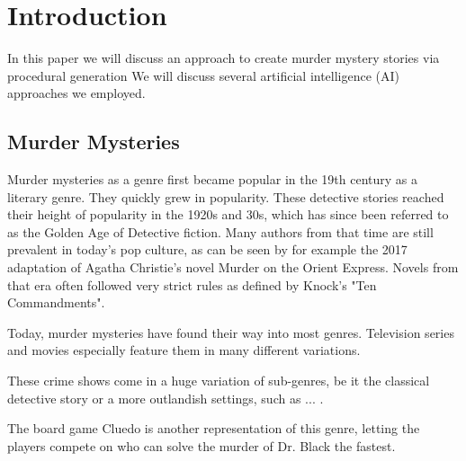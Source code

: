 \section{Introduction} \label{introduction}

In this paper we will discuss an approach to create murder mystery stories via procedural generation
We will discuss several artificial intelligence (AI) approaches we employed.

\subsection{Murder Mysteries}

Murder mysteries as a genre first became popular in the 19th century as a literary genre.
They quickly grew in popularity.
These detective stories reached their height of popularity in the 1920s and 30s, which has since been referred to as the Golden Age of Detective fiction.
Many authors from that time are still prevalent in today's pop culture, as can be seen by for example the 2017 adaptation of Agatha Christie's novel Murder on the Orient Express.
Novels from that era often followed very strict rules as defined by Knock's "Ten Commandments".

Today, murder mysteries have found their way into most genres.
Television series and movies especially feature them in many different variations.

These crime shows come in a huge variation of sub-genres, be it the classical detective story or a more outlandish settings, such as ... .


The board game Cluedo is another representation of this genre, letting the players compete on who can solve the murder of Dr. Black the fastest.